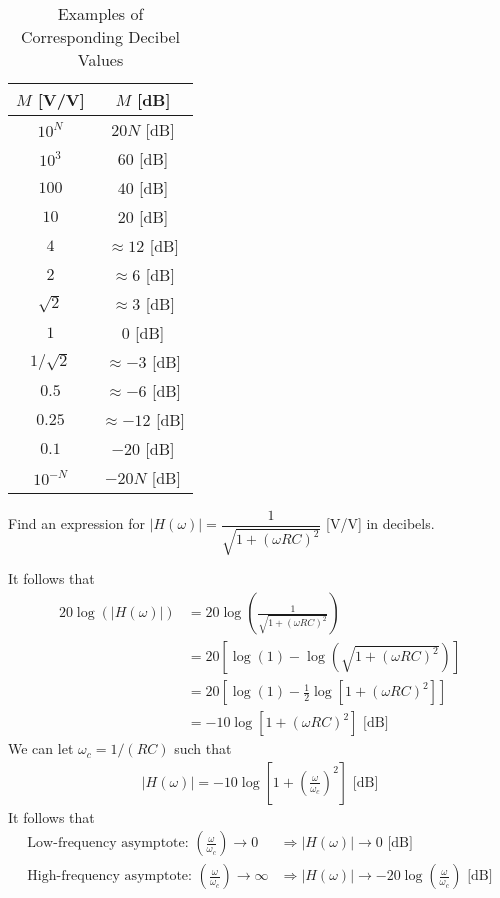 \documentclass{report}
\begin{document}
\begin{table}[!hbt]
    \centering
    \caption{Examples of Corresponding Decibel Values}
    \label{decibels}
    \begin{tabular}{|c|c|}
        $M$ [V/V] & $M$ [dB] \\
        \hline
        $10^N$ & $20N$ [dB] \\
        $10^3$ & $60$ [dB] \\
        $100$ & $40$ [dB] \\
        $10$ & $20$ [dB] \\
        $4$ & $\approx 12$ [dB] \\
        $2$ & $\approx 6$ [dB] \\
        $\sqrt{2}$ & $\approx 3$ [dB] \\
        $1$ & $0$ [dB] \\
        $1/\sqrt{2}$ & $\approx -3$ [dB] \\
        $0.5$ & $\approx -6$ [dB] \\
        $0.25$ & $\approx -12$ [dB] \\
        $0.1$ & $-20$ [dB] \\
        $10^{-N}$ & $-20N$ [dB] \\ 
    \end{tabular}
\end{table}

\begin{example}
    Find an expression for $|H(\omega)| = \dfrac{1}{\sqrt{1+(\omega RC)^2}}$ [V/V] in decibels.
\end{example}
\begin{solution}
    It follows that 
    \begin{align*}
        20\log(|H(\omega)|) &= 20\log\left(\frac{1}{\sqrt{1+(\omega RC)^2}}\right) \\
        &= 20\left[\log(1) - \log\left(\sqrt{1+(\omega RC)^2}\right)\right] \\
        &= 20\left[\log(1) - \frac{1}{2}\log\left[1+(\omega RC)^2\right]\right] \\
        &= -10\log\left[1+(\omega RC)^2\right] \text{ [dB]}
    \end{align*}
    We can let $\omega_c = 1/(RC)$ such that
    \begin{align*}
        |H(\omega)| = -10\log\left[1+\left(\frac{\omega}{\omega_c}\right)^2\right] \text{ [dB]}
    \end{align*}
    It follows that 
    \begin{align*}
        \text{Low-frequency asymptote: } \left(\frac{\omega}{\omega_c}\right)\rightarrow 0 &\Longrightarrow |H(\omega)|\rightarrow 0 \text{ [dB]} \\
        \text{High-frequency asymptote: } \left(\frac{\omega}{\omega_c}\right)\rightarrow \infty &\Longrightarrow |H(\omega)|\rightarrow -20\log\left(\frac{\omega}{\omega_c}\right) \text{ [dB]}
    \end{align*}
\end{solution}
\end{document}

